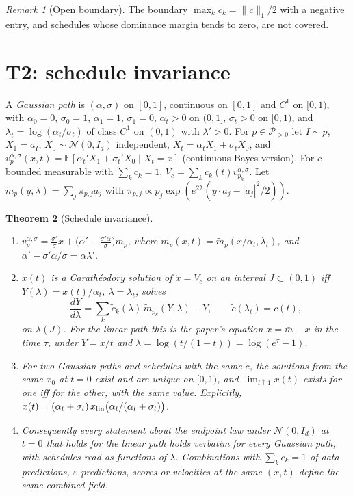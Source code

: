 \documentclass[11pt]{article}
\newtheorem{theorem}{Theorem}
\theoremstyle{definition}
\theoremstyle{remark}
\newtheorem{remark}[theorem]{Remark}
\newcommand{\E}{\mathbb E}
\newcommand{\N}{\mathcal N}
\newcommand{\Ppos}{\mathcal P_{>0}}
\newcommand{\eps}{\varepsilon}
\begin{document}
\begin{remark}[Open boundary]
The boundary $\max_kc_k=\|c\|_1/2$ with a negative entry, and schedules whose dominance margin tends
to zero, are not covered.
\end{remark}

\section{T2: schedule invariance}
\label{sec:t2}

A \emph{Gaussian path} is $(\alpha,\sigma)$ on $[0,1]$, continuous on $[0,1]$ and $C^1$ on $[0,1)$, with
$\alpha_0=0$, $\sigma_0=1$, $\alpha_1=1$, $\sigma_1=0$, $\alpha_t>0$ on $(0,1]$, $\sigma_t>0$ on $[0,1)$, and
$\lambda_t=\log(\alpha_t/\sigma_t)$ of class $C^1$ on $(0,1)$ with $\lambda'>0$. For $p\in\Ppos$ let
$I\sim p$, $X_1=a_I$, $X_0\sim\N(0,I_d)$ independent, $X_t=\alpha_tX_1+\sigma_tX_0$, and
$v^{\alpha,\sigma}_p(x,t)=\E[\alpha_t'X_1+\sigma_t'X_0\mid X_t=x]$ (continuous Bayes version). For
$c$ bounded measurable with $\sum_kc_k=1$, $V_c=\sum_kc_k(t)v^{\alpha,\sigma}_{p_k}$. Let
$\tilde m_p(y,\lambda)=\sum_j\pi_{p,j}a_j$ with $\pi_{p,j}\propto p_j\exp(e^{2\lambda}(y\cdot a_j-|a_j|^2/2))$.

\begin{theorem}[Schedule invariance]\label{thm:schedule-invariance}
\begin{enumerate}[label=(\alph*),leftmargin=2em]
\item $v^{\alpha,\sigma}_p=\frac{\sigma'}\sigma x+\big(\alpha'-\frac{\sigma'\alpha}\sigma\big)m_p$, where
  $m_p(x,t)=\tilde m_p(x/\alpha_t,\lambda_t)$, and $\alpha'-\sigma'\alpha/\sigma=\alpha\lambda'$.
\item $x(t)$ is a Carath\'eodory solution of $\dot x=V_c$ on an interval $J\subset(0,1)$ iff
  $Y(\lambda)=x(t)/\alpha_t$, $\lambda=\lambda_t$, solves
  \[
  \frac{dY}{d\lambda}=\sum_k\tilde c_k(\lambda)\,\tilde m_{p_k}(Y,\lambda)-Y,\qquad\tilde c(\lambda_t)=c(t),
  \]
  on $\lambda(J)$. For the linear path this is the paper's equation $\dot x=\bar m-x$ in the time
  $\tau$, under $Y=x/t$ and $\lambda=\log(t/(1-t))=\log(e^\tau-1)$.
\item For two Gaussian paths and schedules with the same $\tilde c$, the solutions from the same
  $x_0$ at $t=0$ exist and are unique on $[0,1)$, and $\lim_{t\uparrow1}x(t)$ exists for one iff
  for the other, with the same value. Explicitly,
  $x(t)=(\alpha_t+\sigma_t)\,x_{\rm lin}\big(\alpha_t/(\alpha_t+\sigma_t)\big)$.
\item Consequently every statement about the endpoint law under $\N(0,I_d)$ at $t=0$ that holds for
  the linear path holds verbatim for every Gaussian path, with schedules read as functions of
  $\lambda$. Combinations with $\sum_kc_k=1$ of data predictions, $\eps$-predictions, scores or
  velocities at the same $(x,t)$ define the same combined field.
\end{enumerate}
\end{theorem}
\end{document}
